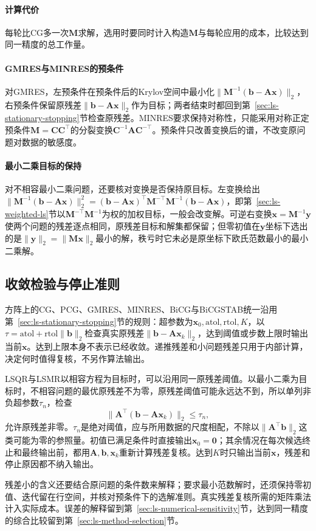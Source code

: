 \paragraph{计算代价}
每轮比CG多一次$\bm M$求解，选用时要同时计入构造$\bm M$与每轮应用的成本，比较达到同一精度的总工作量。

\paragraph{GMRES与MINRES的预条件}
对GMRES，左预条件在预条件后的Krylov空间中最小化$\lVert\bm M^{-1}(\bm b-\bm A\bm x)\rVert_2$，右预条件保留原残差$\lVert\bm b-\bm A\bm x\rVert_2$作为目标；两者结束时都回到第~\ref{sec:ls-stationary-stopping}节检查原残差。MINRES要求保持对称性，只能采用对称正定预条件$\bm M=\bm C\bm C^\top$的分裂变换$\bm C^{-1}\bm A\bm C^{-\top}$。预条件只改善变换后的谱，不改变原问题对数据的敏感度。

\paragraph{最小二乘目标的保持}
对不相容最小二乘问题，还要核对变换是否保持原目标。左变换给出$\lVert\bm M^{-1}(\bm b-\bm A\bm x)\rVert_2^2=(\bm b-\bm A\bm x)^\top\bm M^{-\top}\bm M^{-1}(\bm b-\bm A\bm x)$，即第~\ref{sec:ls-weighted-ls}节以$\bm M^{-\top}\bm M^{-1}$为权的加权目标，一般会改变解。可逆右变换$\bm x=\bm M^{-1}\bm y$使两个问题的残差逐点相同，原残差目标和解集都保留；但零初值在$\bm y$坐标下选出的是$\lVert\bm y\rVert_2=\lVert\bm M\bm x\rVert_2$最小的解，秩亏时它未必是原坐标下欧氏范数最小的最小二乘解。

\subsection{收敛检验与停止准则}
\label{sec:ls-krylov-stopping}

方阵上的CG、PCG、GMRES、MINRES、BiCG与BiCGSTAB统一沿用第~\ref{sec:ls-stationary-stopping}节的规则：超参数为$\bm x_0,\mathrm{atol},\mathrm{rtol},K$，以$\tau=\mathrm{atol}+\mathrm{rtol}\lVert\bm b\rVert_2$检查真实原残差$\lVert\bm b-\bm A\bm x_k\rVert_2$，达到阈值或步数上限时输出当前$\bm x$。达到上限本身不表示已经收敛。递推残差和小问题残差只用于内部计算，决定何时值得复核，不另作算法输出。

LSQR与LSMR以相容方程为目标时，可以沿用同一原残差阈值。以最小二乘为目标时，不相容问题的最优原残差不为零，原残差阈值可能永远达不到，所以单列非负超参数$\tau_n$，检查
\[
 \lVert\bm A^\top(\bm b-\bm A\bm x_k)\rVert_2\le\tau_n ,
\]
允许原残差非零。$\tau_n$是绝对阈值，应与所用数据的尺度相配，不除以$\lVert\bm A^\top\bm b\rVert_2$这类可能为零的参照量。初值已满足条件时直接输出$\bm x_0=\bm0$；其余情况在每次候选终止和最终输出前，都用$\bm A,\bm b,\bm x_k$重新计算残差复核。达到$K$时只输出当前$\bm x$，残差和停止原因都不纳入输出。

残差小的含义还要结合原问题的条件数来解释；要求最小范数解时，还须保持零初值、迭代留在行空间，并核对预条件下的选解准则。真实残差复核所需的矩阵乘法计入实际成本。误差的解释留到第~\ref{sec:ls-numerical-sensitivity}节，达到同一精度的综合比较留到第~\ref{sec:ls-method-selection}节。
